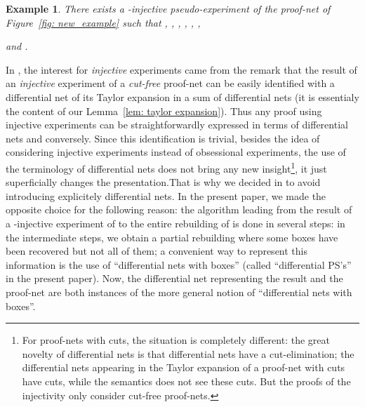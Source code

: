 \documentclass{article}
\theoremstyle{plain}
\newtheorem{example}{Example}
\begin{document}
\begin{example}\label{example: pseudo}
There exists a -injective pseudo-experiment  of the proof-net  of Figure~\ref{fig: new_example} such that
, 
, 
, 
, 
  , 
  , 
   
and   .
\end{example}



In \cite{LPSinjectivity}, the interest for \emph{injective} experiments came from the remark that the result of an \emph{injective} experiment of a \emph{cut-free} proof-net can be easily identified with a differential net of its Taylor expansion in a sum of differential nets \cite{EhrhardRegnier:DiffNets} (it is essentialy the content of our Lemma~\ref{lem: taylor expansion}). Thus any proof using injective experiments can be straightforwardly expressed in terms of differential nets and conversely. Since this identification is trivial, besides the idea of considering injective experiments instead of obsessional experiments, the use of the terminology of differential nets does not bring any new insight\footnote{For proof-nets with cuts, the situation is completely different: the great novelty of differential nets is that differential nets have a cut-elimination; the differential nets appearing in the Taylor expansion of a proof-net with cuts have cuts, while the semantics does not see these cuts. But the proofs of the injectivity only consider cut-free proof-nets.}, it just superficially changes the presentation.That is why we decided in \cite{LPSinjectivity} to avoid introducing explicitely differential nets. In the present paper, we made the opposite choice for the following reason: 
the algorithm leading from the result of a -injective experiment of  to the entire rebuilding of  is done in several steps: in the intermediate steps, we obtain a partial rebuilding where some boxes have been recovered but not all of them; a convenient way to represent this information is the use of ``differential nets with boxes'' (called ``differential PS's'' in the present paper). Now, the differential net representing the result and the proof-net  are both instances of the more general notion of ``differential nets with boxes''.
\end{document}
